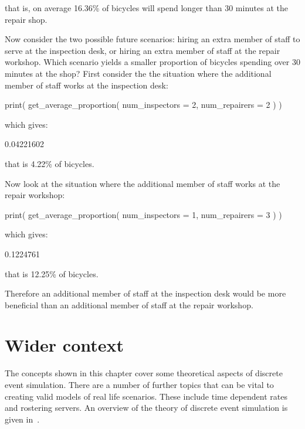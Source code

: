 that is, on average 16.36\% of bicycles will spend longer than 30 minutes at the
repair shop.

Now consider the two possible future scenarios: hiring an
extra member of staff to serve at the inspection desk, or hiring an extra member
of staff at the repair workshop. Which scenario yields a smaller proportion of
bicycles spending over 30 minutes at the shop? First consider the
the situation where the additional member of staff works at the inspection desk:

\begin{Rin}
print(
  get_average_proportion(
    num_inspectors = 2,
    num_repairers = 2
  )
)
\end{Rin}

which gives:

\begin{Rout}
[1] 0.04221602
\end{Rout}

that is 4.22\% of bicycles.

Now look at the situation where the additional member of staff works at the
repair workshop:

\begin{Rin}
print(
  get_average_proportion(
    num_inspectors = 1,
    num_repairers = 3
  )
)
\end{Rin}

which gives:

\begin{Rout}
[1] 0.1224761
\end{Rout}

that is 12.25\% of bicycles.

Therefore an additional member of staff at the inspection desk would be more
beneficial than an additional member of staff at the repair workshop.

\section{Wider context}\label{sec:discrete_event_simulation_wider_context}

The concepts shown in this chapter cover some theoretical aspects of discrete
event simulation. There are a number of further topics that can be vital to
creating valid models of real life scenarios. These include time dependent rates
and rostering servers. An overview of the theory of discrete event simulation is
given in~\cite{robinson2004simulation}.

